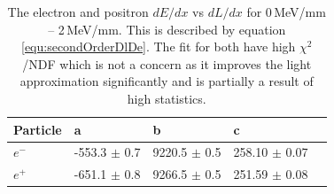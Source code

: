\begin{table}[!h]
\centering
\begin{tabular}{lllll}  
\toprule
Particle       & a                 & b                 & c                 \\%
\midrule
$e^-$          & -553.3 $\pm$ 0.7  & 9220.5 $\pm$ 0.5  & 258.10 $\pm$ 0.07 \\%
$e^+$          & -651.1 $\pm$ 0.8  & 9266.5 $\pm$ 0.5  & 251.59 $\pm$ 0.08 \\%
\bottomrule  
\end{tabular}
\caption[The electron and positron $dE/dx$ vs $dL/dx$ for 0\,MeV/mm -- 2\,MeV/mm]{The electron and positron $dE/dx$ vs $dL/dx$ for 0\,MeV/mm -- 2\,MeV/mm. This is described by equation \ref{equ:secondOrderDlDe}. The fit for both have high $\chi^2$/NDF which is not a concern as it improves the light approximation significantly and is partially a result of high statistics. }
\label{tab:e-e+SquareDlDeTable}
\end{table}

